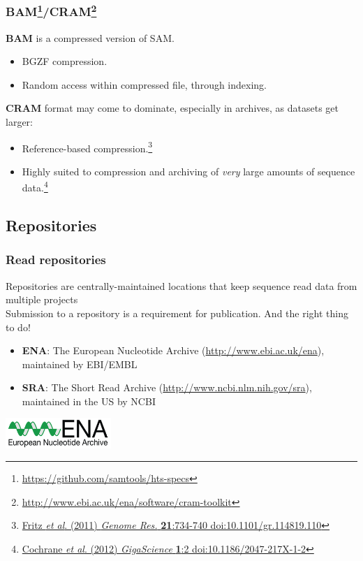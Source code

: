 \begin{frame}[fragile]
  \frametitle{BAM\footnote{\tiny{\href{http://samtools.github.io/hts-specs/SAMv1.pdf}{https://github.com/samtools/hts-specs}}}/CRAM\footnote{\tiny{\href{http://www.ebi.ac.uk/ena/software/cram-toolkit}{http://www.ebi.ac.uk/ena/software/cram-toolkit}}}}
  \textbf{BAM} is a compressed version of SAM.\\
  \begin{itemize}
    \item BGZF compression.
    \item Random access within compressed file, through indexing.
  \end{itemize}
  \textbf{CRAM} format may come to dominate, especially in archives, as datasets get larger:
  \begin{itemize}
    \item Reference-based compression.\footnote{\tiny{\href{http://dx.doi.org/10.1101/gr.114819.110}{Fritz \textit{et al}. (2011) \textit{Genome Res.} \textbf{21}:734-740 doi:10.1101/gr.114819.110}}}
    \item Highly suited to compression and archiving of \textit{very} large amounts of sequence data.\footnote{\tiny{\href{http://dx.doi.org/10.1186/2047-217X-1-2}{Cochrane \textit{et al}. (2012) \textit{GigaScience} \textbf{1}:2 doi:10.1186/2047-217X-1-2}}}
  \end{itemize}  
\end{frame}

\subsection{Repositories}

\begin{frame}[fragile]
  \frametitle{Read repositories}
  Repositories are centrally-maintained locations that keep sequence read data from multiple projects\\
  Submission to a repository is a requirement for publication. And the right thing to do!
    \begin{itemize}
    \item \textbf{ENA}: The European Nucleotide Archive (\href{http://www.ebi.ac.uk/ena}{http://www.ebi.ac.uk/ena}), maintained by EBI/EMBL
    \item \textbf{SRA}: The Short Read Archive (\href{http://www.ncbi.nlm.nih.gov/sra}{http://www.ncbi.nlm.nih.gov/sra}), maintained in the US by NCBI
  \end{itemize}
  \begin{center}
    \includegraphics[width=0.3\textwidth]{images/ENA-logo}
  \end{center}    
\end{frame}


